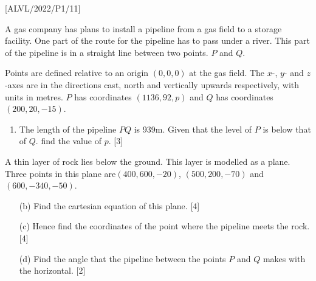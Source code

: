 \item {[}ALVL/2022/P1/11{]}

A gas company has plans to install a pipeline from a gas field to
a storage facility. One part of the route for the pipeline has to
pass under a river. This part of the pipeline is in a straight line
between two points. $P$ and $Q$.

Points are defined relative to an origin $(0,0,0)$ at the gas field.
The $x$-, $y$- and $z$-axes are in the directions cast, north and
vertically upwards respectively, with units in metres. $P$ has coordinates
$\left(1136,92,p\right)$ and $Q$ has coordinates $\left(200,20,-15\right)$.
\begin{enumerate}
\item The length of the pipeline $PQ$ is 939m. Given that the level of
$P$ is below that of $Q$. find the value of $p$.\hfill{} {[}3{]}
\end{enumerate}
A thin layer of rock lies below the ground. This layer is modelled
as a plane. Three points in this plane are$\left(400,600,-20\right)$,
$\left(500,200,-70\right)$ and $\left(600,-340,-50\right)$.
\begin{enumerate}
\item[(b)]  Find the cartesian equation of this plane.\hfill{} {[}4{]}
\item[(c)] Hence find the coordinates of the point where the pipeline meets
the rock.\hfill{} {[}4{]}
\item[(d)]  Find the angle that the pipeline between the points $P$ and $Q$
makes with the horizontal.\hfill{} {[}2{]}
\end{enumerate}
